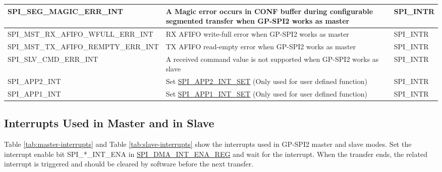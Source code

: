 \documentclass[main\_\_EN.tex]{subfiles}
\begin{document}
\begin{longtable}{ | L{6cm} | L{8.5cm} | L{2.5cm} | }
\label{int:SPISEGMAGICERRINT} SPI\_SEG\_MAGIC\_ERR\_INT & A Magic error occurs in CONF buffer during configurable segmented transfer when GP-SPI2 works as master &SPI\_INTR \\ \hline
\label{int:SPIMSTRXAFIFOWFULLERRINT} SPI\_MST\_RX\_AFIFO\_WFULL\_ERR\_INT & RX AFIFO write-full error when GP-SPI2 works as master & SPI\_INTR \\ \hline
\label{int:SPIMSTTXAFIFOREMPTYERRINT} SPI\_MST\_TX\_AFIFO\_REMPTY\_ERR\_INT &TX AFIFO read-empty error when GP-SPI2 works as master & SPI\_INTR \\ \hline
\label{int:SPISLVCMDERRINT} SPI\_SLV\_CMD\_ERR\_INT & A received command value is not supported when GP-SPI2 works as slave & SPI\_INTR \\ \hline
\label{int:SPIAPP2INT}SPI\_APP2\_INT & Set \hyperref[fielddesc:SPIAPP1INTSET]{SPI\_APP2\_INT\_SET} (Only used for user defined function)& SPI\_INTR \\ \hline
\label{int:SPIAPP1INT}SPI\_APP1\_INT & Set \hyperref[fielddesc:SPIAPP1INTSET]{SPI\_APP1\_INT\_SET} (Only used for user defined function)& SPI\_INTR \\ \hline
\end{longtable}

\subsection{Interrupts Used in Master and in Slave}

Table \ref{tab:master-interrupts} and Table \ref{tab:slave-interrupts} show the interrupts used in GP-SPI2 master and slave modes. Set the interrupt enable bit SPI\_*\_INT\_ENA in \hyperref[regdesc:SPIDMAINTENAREG]{SPI\_DMA\_INT\_ENA\_REG} and wait for the interrupt. When the transfer ends, the related interrupt is triggered and should be cleared by software before the next transfer.
\end{document}
